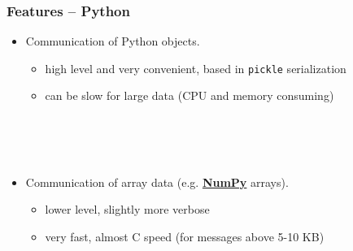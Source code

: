 \documentclass{beamer}
\begin{document}
\begin{frame}
  \frametitle{Features -- Python}
  \begin{itemize}
  \item Communication of Python objects.
    \begin{itemize}
    \item high level and very convenient, based in \texttt{pickle}
      serialization
    \item can be slow for large data (CPU and memory consuming)
    \end{itemize}
    \\
    \\\hspace{39ex}\\
  \item Communication of array data
    (e.g. \href{http://numpy.scipy.org}{\textbf{NumPy}} arrays).
    \begin{itemize}
    \item lower level, slightly more verbose
    \item very fast, almost C speed (for messages above 5-10 KB)
    \end{itemize}
  \end{itemize}
\end{frame}
\end{document}
